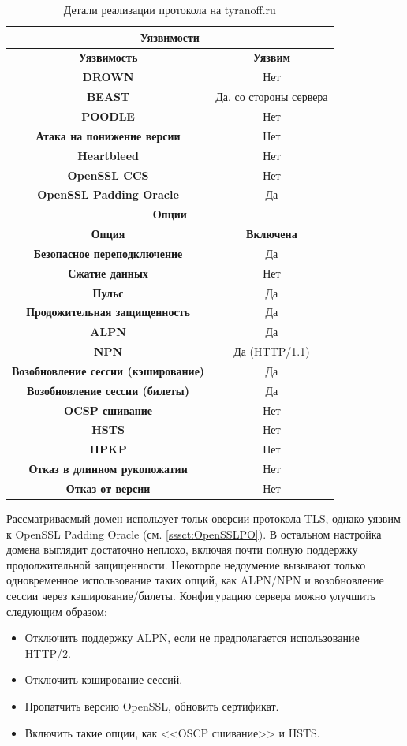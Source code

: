 \begin{table}[H]
    \centering
    \begin{tabular}{c|c}
        \hline
        \multicolumn{2}{c}{\textbf{Уязвимости}} \\ \hline
        \textbf{Уязвимость} & \textbf{Уязвим} \\ \hline
        \textbf{DROWN} & Нет \\
        \textbf{BEAST} & Да, со стороны сервера \\
        \textbf{POODLE} & Нет \\
        \textbf{Атака на понижение версии} & Нет \\
        \textbf{Heartbleed} & Нет \\
        \textbf{OpenSSL CCS} & Нет \\
        \textbf{OpenSSL Padding Oracle} & Да \\ \hline
        \multicolumn{2}{c}{\textbf{Опции}} \\ \hline
        \textbf{Опция} & \textbf{Включена} \\ \hline 
        \textbf{Безопасное переподключение} & Да \\ 
        \textbf{Сжатие данных} & Нет \\ 
        \textbf{Пульс} & Да \\ 
        \textbf{Продожительная защищенность} & Да \\ 
        \textbf{ALPN} & Да \\ 
        \textbf{NPN} & Да (HTTP/1.1) \\ 
        \textbf{Возобновление сессии (кэширование)} & Да \\
        \textbf{Возобновление сессии (билеты)} & Да  \\
        \textbf{OCSP сшивание} & Нет  \\
        \textbf{HSTS} & Нет \\ 
        \textbf{HPKP} & Нет \\ 
        \textbf{Отказ в длинном рукопожатии} & Нет \\ 
        \textbf{Отказ от версии} & Нет \\ 
    \end{tabular}
    \caption{Детали реализации протокола на tyranoff.ru}
    \label{01-protocol-details}
\end{table}

Рассматриваемый домен использует тольк оверсии протокола TLS, однако уязвим к OpenSSL Padding Oracle (см. \ref{sssct:OpenSSLPO}).
В остальном настройка домена выглядит достаточно неплохо, включая почти полную поддержку продолжительной защищенности. Некоторое 
недоумение вызывают только одновременное использование таких опций, как ALPN/NPN и возобновление сессии через кэширование/билеты.
Конфигурацию сервера можно улучшить следующим образом:
\begin{itemize}
    \item Отключить поддержку ALPN, если не предполагается использование HTTP/2.
    \item Отключить кэширование сессий. 
    \item Пропатчить версию OpenSSL, обновить сертификат.
    \item Включить такие опции, как <<OSCP сшивание>> и HSTS. 
\end{itemize}
